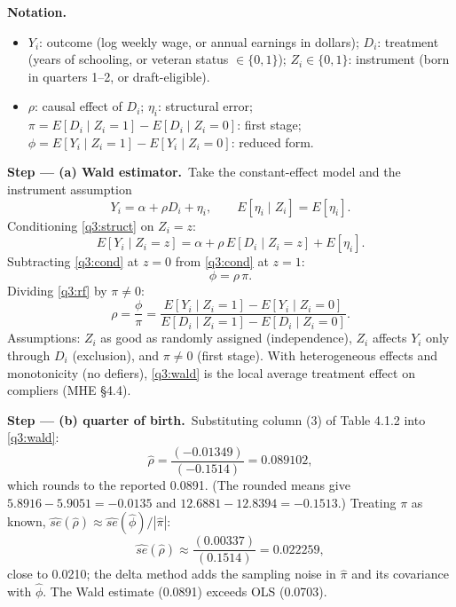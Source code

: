 \documentclass[11pt,a4paper]{article}
\newenvironment{notacao}{\par\smallskip\noindent\textbf{Notation.}\begin{itemize}[leftmargin=1.4em,topsep=1pt,itemsep=0pt]\small}{\end{itemize}}
\newcommand{\passo}[2]{\par\smallskip\noindent\textbf{Step --- #1.}~#2}
\begin{document}
\begin{sol}
\begin{notacao}
\item $Y_i$: outcome (log weekly wage, or annual earnings in dollars); $D_i$: treatment (years of
schooling, or veteran status $\in\{0,1\}$); $Z_i\in\{0,1\}$: instrument (born in quarters 1--2, or draft-eligible).
\item $\rho$: causal effect of $D_i$; $\eta_i$: structural error; $\pi=E[D_i\mid Z_i=1]-E[D_i\mid Z_i=0]$:
first stage; $\phi=E[Y_i\mid Z_i=1]-E[Y_i\mid Z_i=0]$: reduced form.
\end{notacao}

\passo{(a) Wald estimator}{Take the constant-effect model and the instrument assumption
\begin{equation}
Y_i=\alpha+\rho D_i+\eta_i,\qquad E[\eta_i\mid Z_i]=E[\eta_i].\label{q3:struct}
\end{equation}
Conditioning \eqref{q3:struct} on $Z_i=z$:
\begin{equation}
E[Y_i\mid Z_i=z]=\alpha+\rho\,E[D_i\mid Z_i=z]+E[\eta_i].\label{q3:cond}
\end{equation}
Subtracting \eqref{q3:cond} at $z=0$ from \eqref{q3:cond} at $z=1$:
\begin{equation}
\phi=\rho\,\pi.\label{q3:rf}
\end{equation}
Dividing \eqref{q3:rf} by $\pi\neq0$:
\begin{equation}
\rho=\frac{\phi}{\pi}=\frac{E[Y_i\mid Z_i=1]-E[Y_i\mid Z_i=0]}{E[D_i\mid Z_i=1]-E[D_i\mid Z_i=0]}.\label{q3:wald}
\end{equation}
Assumptions: $Z_i$ as good as randomly assigned (independence), $Z_i$ affects $Y_i$ only through $D_i$
(exclusion), and $\pi\neq0$ (first stage). With heterogeneous effects and monotonicity (no defiers),
\eqref{q3:wald} is the local average treatment effect on compliers (MHE \S4.4).}

\passo{(b) quarter of birth}{Substituting column (3) of Table 4.1.2 into \eqref{q3:wald}:
\begin{equation}
\hat\rho=\frac{(-0.01349)}{(-0.1514)}=0.089102,\label{q3:wqob}
\end{equation}
which rounds to the reported 0.0891. (The rounded means give $5.8916-5.9051=-0.0135$ and
$12.6881-12.8394=-0.1513$.) Treating $\pi$ as known, $\widehat{se}(\hat\rho)\approx\widehat{se}(\hat\phi)/|\hat\pi|$:
\begin{equation}
\widehat{se}(\hat\rho)\approx\frac{(0.00337)}{(0.1514)}=0.022259,\label{q3:seqob}
\end{equation}
close to 0.0210; the delta method adds the sampling noise in $\hat\pi$ and its covariance with $\hat\phi$.
The Wald estimate (0.0891) exceeds OLS (0.0703).}


\end{sol}
\end{document}
